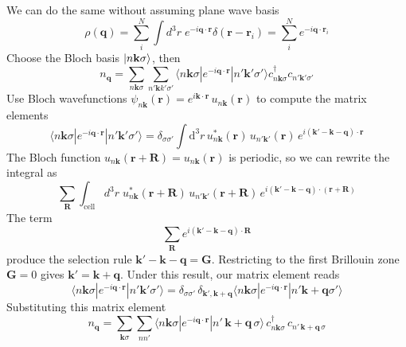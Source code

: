 \documentclass[../../../main.tex]{subfiles}
\begin{document}
We can do the same without assuming plane wave basis
\begin{equation*}
  \rho(\mathbf{q})
  =\sum_{i}^{N}  \int d^3r\;e^{-i\mathbf{q}\cdot\mathbf{r}}\delta(\mathbf{r }-\mathbf{r}_i)
  =\sum_{i}^{N}  e^{-i\mathbf{q}\cdot\mathbf{r}_i}
\end{equation*}
Choose the Bloch basis $\ket{n \mathbf{k }\sigma}$, then
\begin{equation*}
  n_{\mathbf{q}}=\sum_{n \mathbf{k} \sigma}\sum_{n' \mathbf{k}k' \sigma'} \langle n \mathbf{k} \sigma|e^{-i\mathbf{q}\cdot\mathbf{r}}|n' \mathbf{k}' \sigma'\rangle c_{n \mathbf{k} \sigma}^{\dagger}c_{n' \mathbf{k}' \sigma'}
\end{equation*}
Use Bloch wavefunctions $\psi_{n\mathbf{k}}(\mathbf{r}) = e^{i\mathbf{k}\cdot\mathbf{r}}\,u_{n\mathbf{k}}(\mathbf{r})$ to compute the matrix elements
\begin{equation*}
  \langle n \mathbf{k} \sigma|e^{-i\mathbf{q}\cdot\mathbf{r}}|n' \mathbf{k}' \sigma'\rangle
  = \delta_{\sigma\sigma'}\int \mathrm{d}^3 r\,u_{n\mathbf{k}}^*(\mathbf{r})\,u_{n'\mathbf{k}'}(\mathbf{r})\,e^{i(\mathbf{k}'-\mathbf{k}-\mathbf{q})\cdot\mathbf{r}}
\end{equation*}
The Bloch function $u_{n\mathbf{k}}(\mathbf{r}+\mathbf{R}) = u_{n\mathbf{k}}(\mathbf{r})$ is periodic, so we can rewrite the integral as
\begin{equation*}
  \sum_{\mathbf R} \int_{\mathrm{cell}} d^3r\; u_{n\mathbf k}^*(\mathbf r+\mathbf R)\, u_{n'\mathbf k'}(\mathbf r+\mathbf R)\, e^{i(\mathbf k'-\mathbf k-\mathbf q)\cdot(\mathbf r+\mathbf R)}
\end{equation*}
The term
\begin{equation*}
  \sum_{\mathbf{R}}
  e^{i(\mathbf k'-\mathbf k-\mathbf q)\cdot \mathbf R}
\end{equation*}
produce the selection rule $\mathbf k'-\mathbf k-\mathbf q = \mathbf{G}$.
Restricting to the first Brillouin zone $\mathbf{G}=0$ gives $\mathbf{k}' = \mathbf{k} +\mathbf{q}$.
Under this result, our matrix element reads
\begin{equation*}
  \langle n \mathbf{k} \sigma|e^{-i\mathbf{q}\cdot\mathbf{r}}|n' \mathbf{k}' \sigma'\rangle
  =  \delta_{\sigma\sigma'}\,\delta_{\mathbf{k}',\mathbf{k}+\mathbf{q}}
  \langle n \mathbf{k} \sigma|e^{-i\mathbf{q}\cdot\mathbf{r}}|n' \mathbf{k}+\mathbf{q} \sigma'\rangle
\end{equation*}
Substituting this matrix element
\begin{equation*}
  n_{\mathbf{q}} = \sum_{\mathbf{k}\sigma}\sum_{nn'} \langle n\mathbf{k}\sigma|e^{-i\mathbf{q}\cdot\mathbf{r}}|n'\,\mathbf{k}+\mathbf{q}\,\sigma\rangle \, c^{\dagger}_{n\mathbf{k}\sigma}\, c_{n'\,\mathbf{k}+\mathbf{q}\,\sigma}
\end{equation*}
\end{document}

